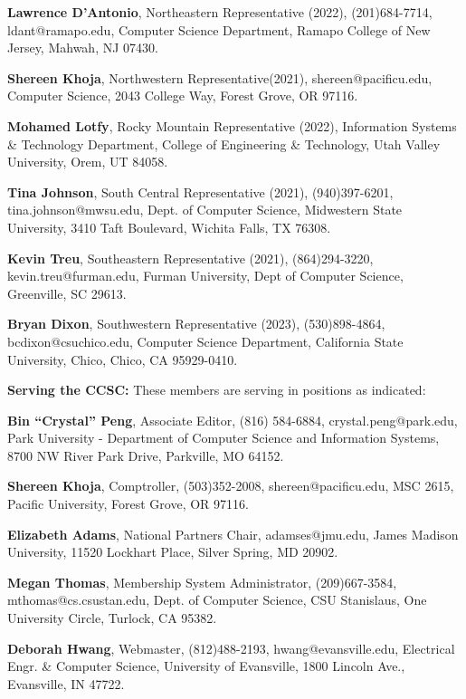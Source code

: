 \documentclass{article}
\begin{document}
\begin{multicols}{2}
\begin{raggedright}
{\noindent
\textbf{Lawrence D'Antonio}, Northeastern Representative (2022), (201)684-7714,
ldant@ramapo.edu, Computer Science Department, Ramapo College of New Jersey,
Mahwah, NJ 07430.

\noindent
\textbf{Shereen Khoja},	Northwestern Representative(2021), shereen@pacificu.edu,
Computer Science, 2043 College Way, Forest Grove, OR 97116.

\noindent
\textbf{Mohamed Lotfy}, Rocky Mountain Representative (2022), Information Systems \& Technology Department,
College of Engineering \& Technology, Utah Valley University, Orem, UT 84058.

\noindent
\textbf{Tina Johnson}, South Central Representative (2021), (940)397-6201,
tina.johnson@mwsu.edu, Dept. of Computer Science, Midwestern State University,
3410 Taft Boulevard, Wichita Falls, TX 76308.

\noindent
\textbf{Kevin Treu}, Southeastern Representative (2021), (864)294-3220,
kevin.treu@furman.edu, Furman University, Dept of Computer Science, Greenville,
SC 29613.

\noindent
\textbf{Bryan Dixon}, Southwestern Representative (2023), (530)898-4864,
bcdixon@csuchico.edu, Computer Science Department, California State University,
Chico, Chico, CA 95929-0410.

\vspace{0.2in}
\noindent
\textbf{Serving the CCSC:} These members are serving in positions as indicated:

\noindent
\textbf{Bin ``Crystal'' Peng}, Associate Editor, (816) 584-6884,
crystal.peng@park.edu, Park University - Department of Computer Science and
Information Systems, 8700 NW River Park Drive, Parkville, MO 64152.

\noindent
\textbf{Shereen Khoja}, Comptroller, (503)352-2008, shereen@pacificu.edu,
MSC 2615, Pacific University, Forest Grove, OR 97116.

\noindent
\textbf{Elizabeth Adams}, National Partners Chair, adamses@jmu.edu,
James Madison University, 11520 Lockhart Place, Silver Spring, MD 20902.

\noindent
\textbf{Megan Thomas}, Membership System Administrator, (209)667-3584,
mthomas@cs.csustan.edu, Dept. of Computer Science, CSU Stanislaus,
One University Circle, Turlock, CA 95382.

\noindent
\textbf{Deborah Hwang}, Webmaster, (812)488-2193, hwang@evansville.edu,
Electrical Engr. \& Computer Science, University of Evansville,
1800 Lincoln Ave., Evansville, IN 47722.

}

\end{raggedright}
\end{multicols}
\end{document}
